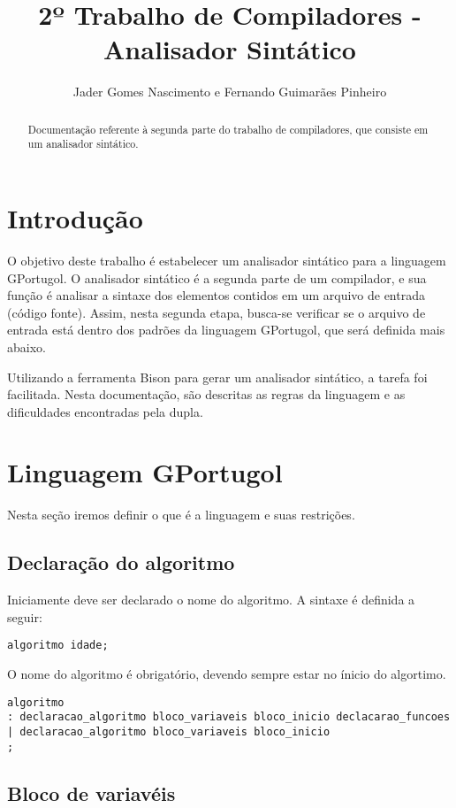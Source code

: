 \documentclass[a4paper,10pt]{article}
\title{2º Trabalho de Compiladores - Analisador Sintático}
\author{Jader Gomes Nascimento e Fernando Guimarães Pinheiro}
\begin{document}
\maketitle

\begin{abstract}
Documentação referente à segunda parte do trabalho de compiladores, que consiste em um analisador sintático.
\end{abstract}

\section{Introdução}
O objetivo deste trabalho é estabelecer um analisador sintático para a linguagem GPortugol. O analisador sintático é a segunda parte de um compilador,
e sua função é analisar a sintaxe dos elementos contidos em um arquivo de entrada (código fonte). Assim, nesta segunda etapa, busca-se verificar se o arquivo de entrada
está dentro dos padrões da linguagem GPortugol, que será definida mais abaixo.

Utilizando a ferramenta Bison para gerar um analisador sintático, a tarefa foi facilitada. Nesta documentação, são descritas as regras da linguagem e as dificuldades encontradas pela dupla.
\section{Linguagem GPortugol}

Nesta seção iremos definir o que é a linguagem e suas restrições.

\subsection{Declaração do algoritmo}

Iniciamente deve ser declarado o nome do algoritmo. A sintaxe é definida a seguir:

\begin{verbatim}
algoritmo idade;
\end{verbatim}

O nome do algoritmo é obrigatório, devendo sempre estar no ínicio do algortimo.

\begin{verbatim}
algoritmo
: declaracao_algoritmo bloco_variaveis bloco_inicio declacarao_funcoes
| declaracao_algoritmo bloco_variaveis bloco_inicio
;
\end{verbatim}

\subsection{Bloco de variavéis}
\end{document}
